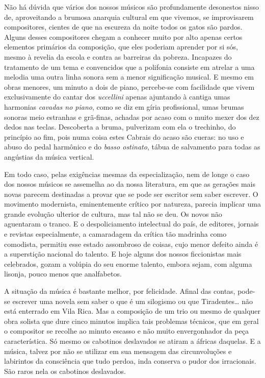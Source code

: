 Não há dúvida que vários dos nossos músicos são profundamente desonestos
nisso de, aproveitando a brumosa anarquia cultural em que vivemos, se
improvisarem compositores, cientes de que na escureza da noite todos os
gatos são pardos. Alguns desses compositores chegam a conhecer muito por
alto apenas certos elementos primários da composição, que eles poderiam
aprender por si sós, mesmo à revelia da escola e contra as barreiras da
pobreza. Incapazes do tratamento de um tema e convencidos que a
polifonia consiste em atrelar a uma melodia uma outra linha sonora sem a
menor significação musical. E mesmo em obras menores, um minuto a dois
de piano, percebe-se com facilidade que vivem exclusivamente do cantar
dos \textit{uccellini} apenas ajuntando à cantiga umas harmonias \textit{cavadas no
piano}, como se diz em gíria profissional, umas brumas sonoras meio
estranhas e grã-finas, achadas por acaso com o muito mexer dos dez dedos
nas teclas. Descoberta a bruma, pulverizam com ela o trechinho, do
princípio ao fim, pois numa coisa estes Cabrais do acaso são cueras: no
uso e abuso do pedal harmônico e do \textit{basso ostinato}, tábua de salvamento
para todas as angústias da música vertical.

Em todo caso, pelas exigências mesmas da especialização, nem de longe o
caso dos nossos músicos se assemelha ao da nossa literatura, em que as
gerações mais novas parecem destinadas a provar que se pode ser escritor
sem saber escrever. O movimento modernista, eminentemente crítico por
natureza, parecia implicar uma grande evolução ulterior de cultura, mas
tal não se deu. Os novos não aguentaram o tranco. E o despoliciamento
intelectual do país, de editores, jornais e revistas especialmente, a
camaradagem da crítica tão madrinha como comodista, permitiu esse estado
assombroso de coisas, cujo menor defeito ainda é a superstição nacional
do talento. E hoje alguns dos nossos ficcionistas mais celebrados, gozam
a volúpia do seu enorme talento, embora sejam, com alguma lisonja, pouco
menos que analfabetos.

A situação da música é bastante melhor, por felicidade. Afinal das
contas, pode-se escrever uma novela sem saber o que é um silogismo ou
que Tiradentes\ldots{} não está enterrado em Vila Rica. Mas a composição de
um trio ou mesmo de qualquer obra solista que dure cinco minutos implica
tais problemas técnicos, que em geral o compositor se recolhe ao minuto
escasso e não muito envergonhador da peça característica. Só mesmo os
cabotinos deslavados se atiram a áfricas daquelas. E a música, talvez
por não se utilizar em sua mensagem das circunvoluções e labirintos da
consciência que tudo perdoa, inda conserva o pudor dos irracionais. São
raros nela os cabotinos deslavados.

